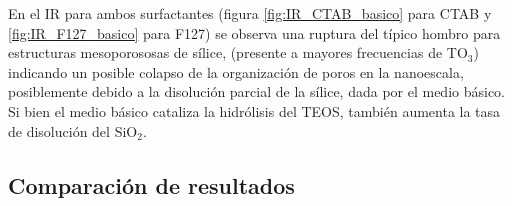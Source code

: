 		 En el IR para ambos surfactantes (figura \ref{fig:IR_CTAB_basico} para CTAB y \ref{fig:IR_F127_basico} para F127) se observa una ruptura del típico hombro para estructuras mesoporososas de sílice\cite{Olsen1989,Innocenzi2003,Angelome2008}, (presente a mayores frecuencias de TO$_3$) indicando un posible colapso de la organización de poros en la nanoescala, posiblemente debido a la disolución parcial de la sílice, dada por el medio básico. Si bien el medio básico cataliza la hidrólisis del TEOS, también aumenta la tasa de disolución del SiO$_2$.\cite{Mazer1994,Niibori2000,Gorrepati2010}

	 \subsection{Comparación de resultados}


